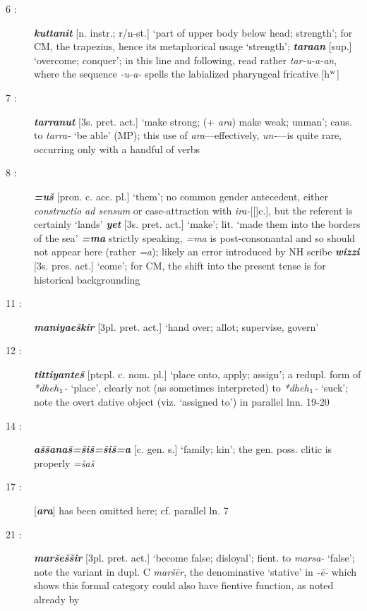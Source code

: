 \documentclass[10pt]{article}
\newcommand{\supersc}[1]{$^{\textrm{\scriptsize{#1}}}$}  	%
\newcommand{\subsc}[1]{$_{\textrm{\scriptsize{#1}}}$}	%
\newcommand{\bit}[1]{\textbf{\textit{#1}}}				%
\newcommand{\p}[1]{{\tiny[{#1}]}}					%
\newcommand{\hi}{h\subsc{1}}								%
\newcommand{\hith}{\textsubwedge{h}}
\renewcommand{\.}[1]{\textsubdot{#1}}
\begin{document}
\begin{description}
\item[6 :] \bit{kuttanit} \p{n. instr.; r/n-st.} `part of upper body below head; strength'; for CM, the trapezius, hence its metaphorical usage `strength'; \bit{tara{\hith\hith}an} \p{sup.} `overcome; conquer'; in this line and following, read rather \textit{tar-u{\hith}-{\hith}a-an}, where the sequence \textit{-u{\hith}-{\hith}a-} spells the labialized pharyngeal fricative [h\supersc{w}]

\item[7 :] \bit{tarranut} \p{3s. pret. act.} `make strong; (+ \textit{ar{\hith}a}) make weak; unman'; caus. to \textit{tarra-} `be able' (MP); this use of \textit{ar{\hith}a}---effectively, \textit{un-}---is quite rare, occurring only with a handful of verbs

\item[8 :] \bit{=u\v{s}} \p{pron. c. acc. pl.} `them'; no common gender antecedent, either \textit{constructio ad sensum} or case-attraction with \textit{ir{\hith}a-}\p[c.], but the referent is certainly `lands' \bit{yet} \p{3s. pret. act.} `make'; lit. `made them into the borders of the sea' \bit{=ma} strictly speaking, \textit{=ma} is post-consonantal and so should not appear here (rather \textit{=a}); likely an error introduced by NH scribe \bit{wizzi} \p{3s. pres. act.} `come'; for CM, the shift into the present tense is for historical backgrounding

\item[11 :] \bit{maniya{\hith\hith}e\v{s}kir} \p{3pl. pret. act.} `hand over; allot; supervise, govern'

\item[12 :] \bit{tittiyante\v{s}} \p{ptcpl. c. nom. pl.} `place onto, apply; assign'; a redupl. form of \textit{*dhe{\hi}-} `place', clearly not (as sometimes interpreted) to \textit{*dhe{\hi}-} `suck'; note the overt dative object (viz. `assigned to') in parallel lnn. 19-20

\item[14 :] \bit{{\hith}a\v{s}\v{s}ana\v{s}=\v{s}i\v{s}=\v{s}i\v{s}=a} \p{c. gen. s.} `family; kin'; the gen. poss. clitic is properly \textit{=\v{s}a\v{s}}

\item[17 :] [\bit{ar{\hith}a}] has been omitted here; cf. parallel ln. 7

\item[21 :] \bit{mar\v{s}e\v{s}\v{s}ir} \p{3pl. pret. act.} `become false; disloyal'; fient. to \textit{marsa-} `false'; note the variant in dupl. C \textit{mar\v{s}\=er}, the denominative `stative' in \textit{-\=e-} which shows this formal category could also have fientive function, as noted already by \citet{watkins1971stative}


\end{description}
\end{document}
